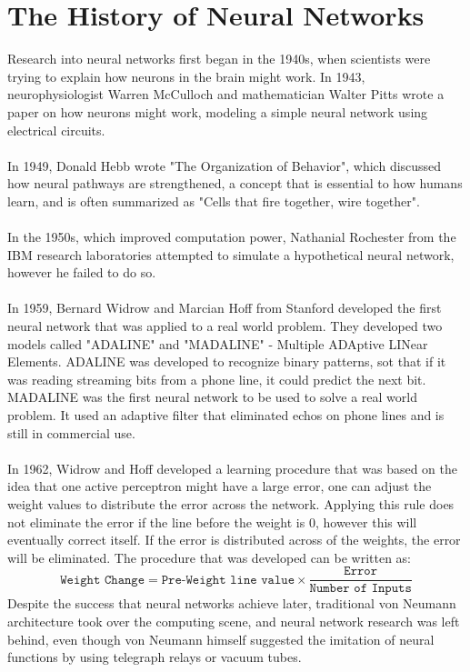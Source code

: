 \documentclass[titlepage]{article}
\begin{document}
\section{The History of Neural Networks}
Research into neural networks first began in the 1940s, when scientists were trying to explain how neurons in the brain might work. In 1943, neurophysiologist Warren McCulloch and mathematician Walter Pitts wrote a paper on how neurons might work, modeling a simple neural network using electrical circuits.
\\\\
In 1949, Donald Hebb wrote "The Organization of Behavior", which discussed how neural pathways are strengthened, a concept that is essential to how humans learn, and is often summarized as "Cells that fire together, wire together".
\\\\
In the 1950s, which improved computation power, Nathanial Rochester from the IBM research laboratories attempted to simulate a hypothetical neural network, however he failed to do so.
\\\\
In 1959, Bernard Widrow and Marcian Hoff from Stanford developed the first neural network that was applied to a real world problem. They developed two models called "ADALINE" and "MADALINE" - Multiple ADAptive LINear Elements. ADALINE was developed to recognize binary patterns, sot that if it was reading streaming bits from a phone line, it could predict the next bit. MADALINE was the first neural network to be used to solve a real world problem. It used an adaptive filter that eliminated echos on phone lines and is still in commercial use.
\\\\
In 1962, Widrow and Hoff developed a learning procedure that was based on the idea that one active perceptron might have a large error, one can adjust the weight values to distribute the error across the network. Applying this rule does not eliminate the error if the line before the weight is 0, however this will eventually correct itself. If the error is distributed across of the weights, the error will be eliminated. The procedure that was developed can be written as:
\begin{equation} \label{eq:Widrow-Hoff}
    \texttt{Weight Change} = \texttt{Pre-Weight line value}\times \frac{\texttt{Error}}{\texttt{Number of Inputs}}
\end{equation}
Despite the success that neural networks achieve later, traditional von Neumann architecture took over the computing scene, and neural network research was left behind, even though von Neumann himself suggested the imitation of neural functions by using telegraph relays or vacuum tubes.
\end{document}
